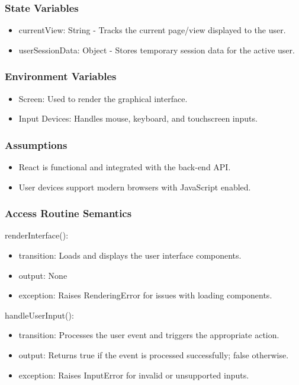 \documentclass[12pt, titlepage]{article}
\begin{document}
\subsubsection{State Variables}

\begin{itemize}
  \item currentView: String - Tracks the current page/view displayed to the user.
  \item userSessionData: Object - Stores temporary session data for the active user.
\end{itemize}

\subsubsection{Environment Variables}

\begin{itemize}
  \item Screen: Used to render the graphical interface.
  \item Input Devices: Handles mouse, keyboard, and touchscreen inputs.
\end{itemize}

\subsubsection{Assumptions}

\begin{itemize}
  \item React is functional and integrated with the back-end API.
  \item User devices support modern browsers with JavaScript enabled.
\end{itemize}

\subsubsection{Access Routine Semantics}

\noindent renderInterface():
\begin{itemize}
\item transition: Loads and displays the user interface components.
\item output: None
\item exception: Raises RenderingError for issues with loading components.
\end{itemize}

\noindent handleUserInput():
\begin{itemize}
\item transition: Processes the user event and triggers the appropriate action.
\item output: Returns true if the event is processed successfully; false otherwise.
\item exception: Raises InputError for invalid or unsupported inputs.
\end{itemize}
\end{document}
